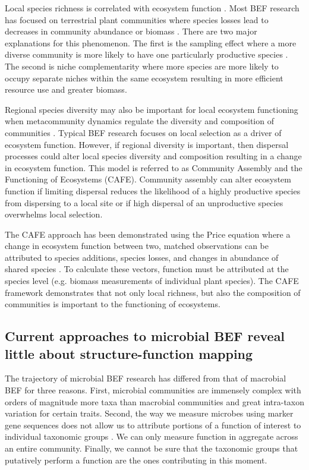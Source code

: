\documentclass{article}
\begin{document}
Local species richness is correlated with ecosystem function
\citep{hooper2005}. Most BEF research has focused on terrestrial plant 
communities where species losses lead to decreases in community abundance or biomass
\citep{naeem2003}. There are
two major explanations for this phenomenon. The first is the sampling effect
where a more diverse community is more likely to have one particularly
productive species \citep{cardinale2006}. The second is niche complementarity where more species are
more likely to occupy separate niches within the same ecosystem resulting in
more efficient resource use and greater biomass.

Regional species diversity may also be important for
local ecosystem functioning when metacommunity dynamics regulate the
diversity and composition of communities \citep{leibold2017}. 
Typical BEF research focuses on local selection
as a driver of ecosystem function. However, if regional
diversity is important, then dispersal processes could alter local species diversity and composition resulting in
a change in ecosystem function. This model is referred to as Community Assembly
and the Functioning of Ecosystems (CAFE). Community assembly can alter ecosystem
function if limiting dispersal reduces the likelihood of a highly productive
species from dispersing to a local site or if high dispersal of an unproductive
species overwhelms local selection.

The CAFE approach has been demonstrated using the Price equation where a change in ecosystem function between two, matched
observations can be attributed to species additions, species losses, and
changes in abundance of shared species \citep{fox2006,
bannar-martin2018}. To
calculate these vectors, function must be attributed at the species level (e.g.
biomass measurements of individual plant species). The CAFE framework demonstrates
that not only local richness, 
but also the composition of communities is important to the functioning of ecosystems.

\subsection{Current approaches to microbial BEF reveal little about 
structure-function mapping}

The trajectory of microbial BEF research has differed from that of macrobial BEF
for three reasons. First, microbial communities are
immensely complex with orders of magnitude more taxa than macrobial communities
and great intra-taxon variation for certain traits. Second, the way we measure
microbes using marker gene sequences does not allow us to attribute portions of
a function of interest to individual taxonomic groups . We can only
measure function in aggregate across an entire community. Finally, we cannot be
sure that the taxonomic groups that putatively perform a function are the ones
contributing in this moment.
\end{document}
